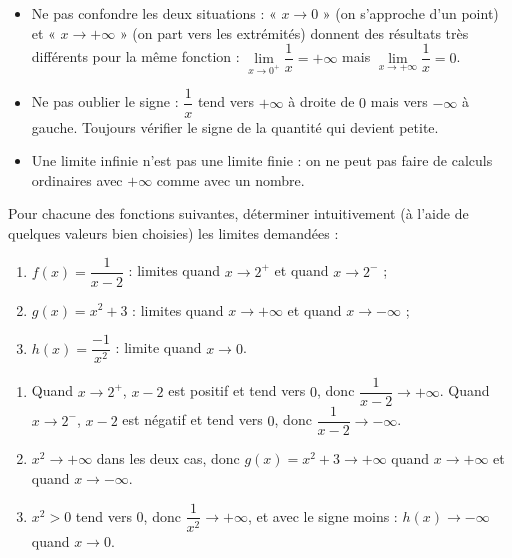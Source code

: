 \documentclass[11pt]{article}
\begin{document}
\begin{attention}
\begin{itemize}
\item Ne pas confondre les deux situations : « $x \to 0$ » (on s'approche d'un point) et « $x \to +\infty$ » (on part vers les extrémités) donnent des résultats très différents pour la même fonction : $\lim\limits_{x \to 0^{+}} \dfrac{1}{x} = +\infty$ mais $\lim\limits_{x \to +\infty} \dfrac{1}{x} = 0$.
\item Ne pas oublier le signe : $\dfrac{1}{x}$ tend vers $+\infty$ à droite de $0$ mais vers $-\infty$ à gauche. Toujours vérifier le signe de la quantité qui devient petite.
\item Une limite infinie n'est pas une limite finie : on ne peut pas faire de calculs ordinaires avec $+\infty$ comme avec un nombre.
\end{itemize}
\end{attention}

\begin{exercice}
Pour chacune des fonctions suivantes, déterminer intuitivement (à l'aide de quelques valeurs bien choisies) les limites demandées :
\begin{enumerate}
\item $f(x) = \dfrac{1}{x-2}$ : limites quand $x \to 2^{+}$ et quand $x \to 2^{-}$ ;
\item $g(x) = x^2 + 3$ : limites quand $x \to +\infty$ et quand $x \to -\infty$ ;
\item $h(x) = \dfrac{-1}{x^2}$ : limite quand $x \to 0$.
\end{enumerate}
\end{exercice}

\begin{corrige}[Exercice 1]
\begin{enumerate}
\item Quand $x \to 2^{+}$, $x - 2$ est positif et tend vers $0$, donc $\dfrac{1}{x-2} \to +\infty$. Quand $x \to 2^{-}$, $x - 2$ est négatif et tend vers $0$, donc $\dfrac{1}{x-2} \to -\infty$.
\item $x^2 \to +\infty$ dans les deux cas, donc $g(x) = x^2 + 3 \to +\infty$ quand $x \to +\infty$ et quand $x \to -\infty$.
\item $x^2 > 0$ tend vers $0$, donc $\dfrac{1}{x^2} \to +\infty$, et avec le signe moins : $h(x) \to -\infty$ quand $x \to 0$.
\end{enumerate}
\end{corrige}
\end{document}
